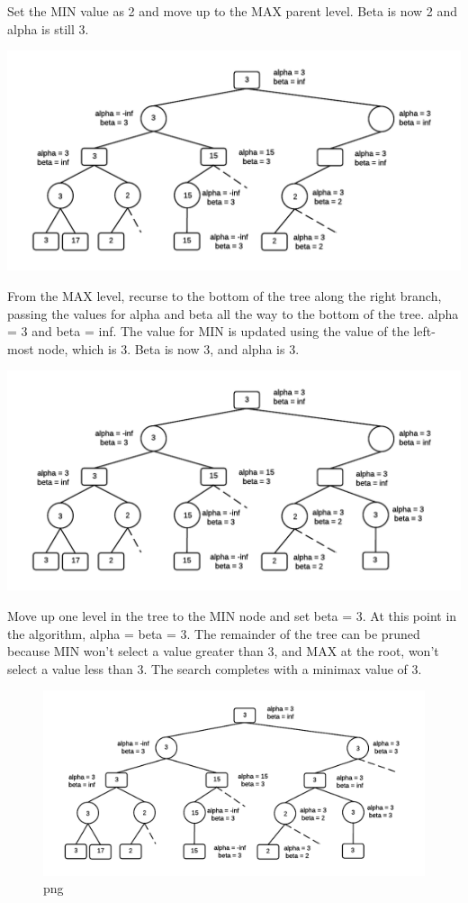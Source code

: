 \documentclass[12pt]{article}
\makeatletter
\def\maxwidth{\ifdim\Gin@nat@width>\linewidth\linewidth
    \else\Gin@nat@width\fi}
\let\Oldincludegraphics\includegraphics
\renewcommand{\includegraphics}[1]{\Oldincludegraphics[width=.8\maxwidth]{#1}}
\makeatother
\begin{document}
Set the MIN value as 2 and move up to the MAX parent level. Beta is now
2 and alpha is still 3.

\includegraphics{img/ABExample10.png}

From the MAX level, recurse to the bottom of the tree along the right
branch, passing the values for alpha and beta all the way to the bottom
of the tree. alpha = 3 and beta = inf. The value for MIN is updated
using the value of the left-most node, which is 3. Beta is now 3, and
alpha is 3.

\includegraphics{img/ABExample11.png}

Move up one level in the tree to the MIN node and set beta = 3. At this
point in the algorithm, alpha = beta = 3. The remainder of the tree can
be pruned because MIN won't select a value greater than 3, and MAX at
the root, won't select a value less than 3. The search completes with a
minimax value of 3.

\begin{figure}[htbp]
\centering
\includegraphics{img/ABExample12.png}
\caption{png}
\end{figure}
\end{document}
